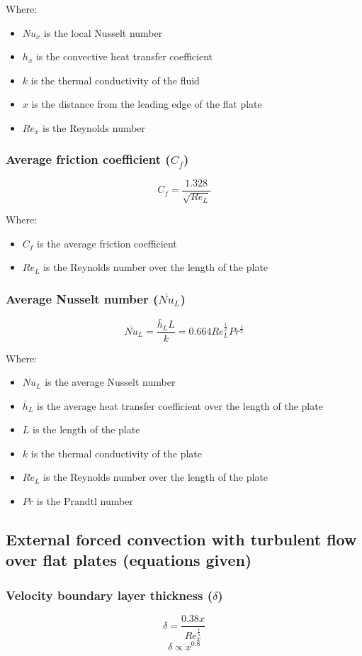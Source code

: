 \documentclass[11pt]{article}
\begin{document}
Where:
\begin{itemize}
\item \(Nu_x\) is the local Nusselt number
\item \(h_x\) is the convective heat transfer coefficient
\item \(k\) is the thermal conductivity of the fluid
\item \(x\) is the distance from the leading edge of the flat plate
\item \(Re_x\) is the Reynolds number
\end{itemize}
\subsubsection{Average friction coefficient (\(C_f\))}
\label{sec:orgd50617c}
\[C_f = \frac{1.328}{\sqrt{Re_L}}\]

Where:
\begin{itemize}
\item \(C_f\) is the average friction coefficient
\item \(Re_L\) is the Reynolds number over the length of the plate
\end{itemize}
\subsubsection{Average Nusselt number (\(\overline{Nu}_L\))}
\label{sec:orgc5fe392}
\[\overline{Nu}_L = \frac{\bar{h}_L L}{k} = 0.664 Re_L^{\frac{1}{2}} Pr^{\frac{1}{3}}\]

Where:
\begin{itemize}
\item \(\overline{Nu}_L\) is the average Nusselt number
\item \(\bar{h}_L\) is the average heat transfer coefficient over the length of the plate
\item \(L\) is the length of the plate
\item \(k\) is the thermal conductivity of the plate
\item \(Re_L\) is the Reynolds number over the length of the plate
\item \(Pr\) is the Prandtl number
\end{itemize}
\subsection{External forced convection with turbulent flow over flat plates (equations given)}
\label{sec:org5ab0665}

\subsubsection{Velocity boundary layer thickness (\(\delta\))}
\label{sec:org540a780}
\[\delta = \frac{0.38 x}{Re_x^{\frac{1}{5}}}\]
\[\delta \propto x^{0.8}\]
\end{document}
